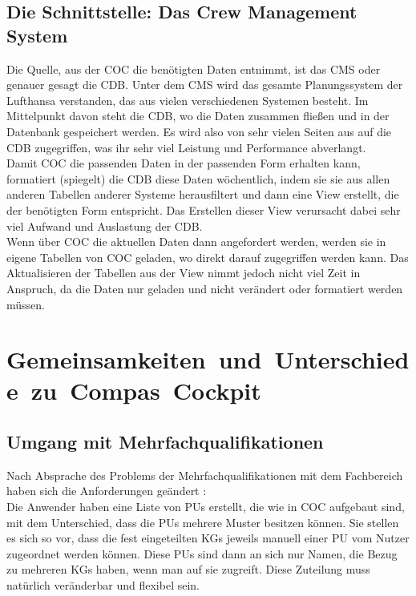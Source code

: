 \documentclass [12pt, a4paper, oneside, titlepage, ngerman]{article}
\begin{document}
\subsection {Die Schnittstelle: Das Crew Management System}
Die Quelle, aus der \ac{COC} die benötigten Daten entnimmt, ist das \ac{CMS} oder genauer gesagt die \ac{CDB}. Unter dem \ac{CMS} wird das gesamte Planungssystem der Lufthansa verstanden, das aus vielen verschiedenen Systemen besteht. Im Mittelpunkt davon steht die \ac{CDB}, wo die Daten zusammen fließen und in der Datenbank gespeichert werden. Es wird also von sehr vielen Seiten aus auf die \ac{CDB} zugegriffen, was ihr sehr viel Leistung und Performance abverlangt. \\
Damit \ac{COC} die passenden Daten in der passenden Form erhalten kann, formatiert (spiegelt) die \ac{CDB} diese Daten wöchentlich, indem sie sie aus allen anderen Tabellen anderer Systeme herausfiltert und dann eine View erstellt, die der benötigten Form entspricht. Das Erstellen dieser View verursacht dabei sehr viel Aufwand und Auslastung der \ac{CDB}.\\
Wenn über \ac{COC} die aktuellen Daten dann angefordert werden, werden sie in eigene Tabellen von \ac{COC} geladen, wo direkt darauf zugegriffen werden kann. Das Aktualisieren der Tabellen aus der View nimmt jedoch nicht viel Zeit in Anspruch, da die Daten nur geladen und nicht verändert oder formatiert werden müssen.



\section{\mbox{Gemeinsamkeiten und Unterschiede zu Compas Cockpit}}
\subsection{Umgang mit Mehrfachqualifikationen}
Nach Absprache des Problems der Mehrfachqualifikationen mit dem Fachbereich haben sich die Anforderungen geändert \cite[vgl.][]{Gespraech4}: \\
Die Anwender haben eine Liste von \acp{PU} erstellt, die wie in \ac{COC} aufgebaut sind, mit dem Unterschied, dass die \acp{PU} mehrere Muster besitzen können. Sie stellen es sich so vor, dass die fest eingeteilten \acp{KG} jeweils manuell einer \ac{PU} vom Nutzer zugeordnet werden können. Diese \acp{PU} sind dann an sich nur Namen, die Bezug zu mehreren \acp{KG} haben, wenn man auf sie zugreift. Diese Zuteilung muss natürlich veränderbar und flexibel sein.
\end{document}
